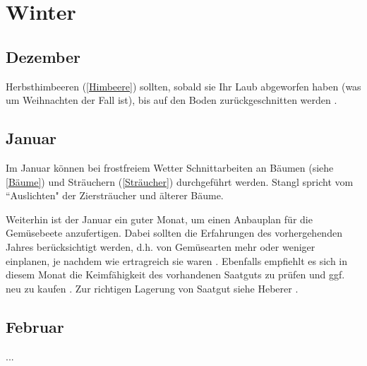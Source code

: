 \pagebreak

\section{Winter}

\subsection{Dezember}

Herbsthimbeeren (\ref{Himbeere}) sollten, sobald sie Ihr Laub abgeworfen haben (was um Weihnachten der Fall ist), bis auf den Boden zurückgeschnitten werden \cite[S.~421]{Don2021}.

\subsection{Januar}

Im Januar können bei frostfreiem Wetter Schnittarbeiten an \textrightarrow Bäumen (siehe \ref{Bäume}) und \textrightarrow Sträuchern (\ref{Sträucher}) durchgeführt werden.
Stangl \cite[S.~256]{Stangl1995} spricht vom ``Auslichten" der Ziersträucher und älterer Bäume.

Weiterhin ist der Januar ein guter Monat, um einen Anbauplan für die Gemüsebeete anzufertigen.
Dabei sollten die Erfahrungen des vorhergehenden Jahres berücksichtigt werden, d.h. von Gemüsearten mehr oder weniger einplanen, je nachdem wie ertragreich sie waren \cite[S.~256]{Stangl1995}.
Ebenfalls empfiehlt es sich in diesem Monat die Keimfähigkeit des vorhandenen Saatguts zu prüfen und ggf. neu zu kaufen \cite[S.~216]{Heberer2018}.
Zur richtigen Lagerung von Saatgut siehe Heberer \cite[S.~179]{Heberer2018}.

\subsection{Februar}

...
